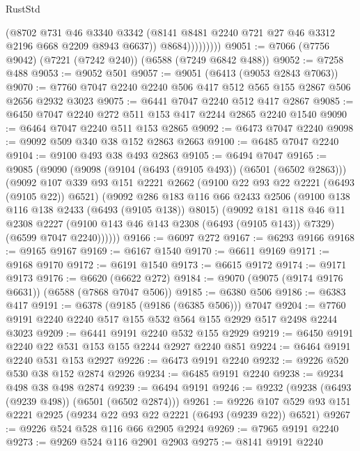 \begin{lexlean}{RustStd}
\begin{coremodule}
                      (@8702
                        @731
                        @46
                        @3340
                        @3342
                        (@8141 @8481 @2240 @721 @27 @46 @3312 @2196 @668 @2209 @8943 @6637))
                      @8684)))))))))
@9051 := @7066 (@7756 @9042) (@7221 (@7242 @240)) (@6588 (@7249 @6842 @488))
@9052 := @7258 @488
@9053 := @9052 @501
@9057 := @9051 (@6413 (@9053 @2843 @7063))
@9070 := @7760 @7047 @2240 @2240 @506 @417 @512 @565 @155 @2867 @506 @2656 @2932 @3023
@9075 := @6441 @7047 @2240 @512 @417 @2867
@9085 := @6450 @7047 @2240 @272 @511 @153 @417 @2244 @2865 @2240 @1540
@9090 := @6464 @7047 @2240 @511 @153 @2865
@9092 := @6473 @7047 @2240
@9098 := @9092 @509 @340 @38 @152 @2863 @2663
@9100 := @6485 @7047 @2240
@9104 := @9100 @493 @38 @493 @2863
@9105 := @6494 @7047
@9165 := @9085
    (@9090
      (@9098
        (@9104 (@6493 (@9105 @493)) (@6501 (@6502 @2863)))
        (@9092
          @107
          @339
          @93
          @151
          @2221
          @2662
          (@9100 @22 @93 @22 @2221 (@6493 (@9105 @22)) @6521)
          (@9092
            @286
            @183
            @116
            @66
            @2433
            @2506
            (@9100 @138 @116 @138 @2433 (@6493 (@9105 @138)) @8015)
            (@9092
              @181
              @118
              @46
              @11
              @2308
              @2227
              (@9100 @143 @46 @143 @2308 (@6493 (@9105 @143)) @7329)
              (@6599 @7047 @2240))))))
@9166 := @6097 @272
@9167 := @6293 @9166
@9168 := @9165 @9167
@9169 := @6167 @1540
@9170 := @6611 @9169
@9171 := @9168 @9170
@9172 := @6191 @1540
@9173 := @6615 @9172
@9174 := @9171 @9173
@9176 := @6620 (@6622 @272)
@9184 := @9070 (@9075 (@9174 @9176 @6631)) (@6588 (@7868 @7047 @506))
@9185 := @6380 @506
@9186 := @6383 @417
@9191 := @6378 (@9185 (@9186 (@6385 @506))) @7047
@9204 := @7760 @9191 @2240 @2240 @517 @155 @532 @564 @155 @2929 @517 @2498 @2244 @3023
@9209 := @6441 @9191 @2240 @532 @155 @2929
@9219 := @6450 @9191 @2240 @22 @531 @153 @155 @2244 @2927 @2240 @851
@9224 := @6464 @9191 @2240 @531 @153 @2927
@9226 := @6473 @9191 @2240
@9232 := @9226 @520 @530 @38 @152 @2874 @2926
@9234 := @6485 @9191 @2240
@9238 := @9234 @498 @38 @498 @2874
@9239 := @6494 @9191
@9246 := @9232 (@9238 (@6493 (@9239 @498)) (@6501 (@6502 @2874)))
@9261 := @9226 @107 @529 @93 @151 @2221 @2925 (@9234 @22 @93 @22 @2221 (@6493 (@9239 @22)) @6521)
@9267 := @9226 @524 @528 @116 @66 @2905 @2924
@9269 := @7965 @9191 @2240
@9273 := @9269 @524 @116 @2901 @2903
@9275 := @8141 @9191 @2240

\end{coremodule}
\end{lexlean}
